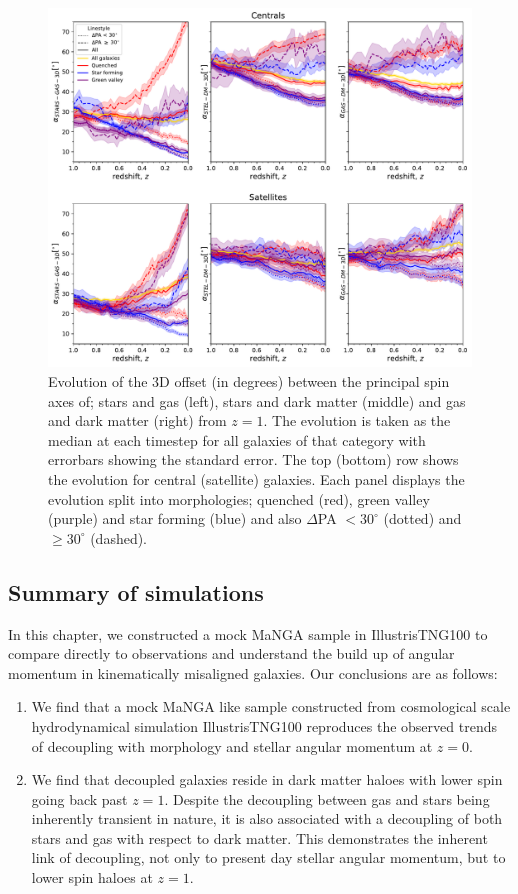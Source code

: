 \begin{figure}
	\includegraphics[width=\linewidth]{misalignment_TNG/3D_pa_evo_cen_sat.pdf}
    \caption{Evolution of the 3D offset (in degrees) between the principal spin axes of; stars and gas (left), stars and dark matter (middle) and gas and dark matter (right) from $z=1$. The evolution is taken as the median at each timestep for all galaxies of that category with errorbars showing the standard error. The top (bottom) row shows the evolution for central (satellite) galaxies. Each panel displays the evolution split into morphologies; quenched (red), green valley (purple) and star forming (blue) and also $\Delta$PA $< 30^{\circ}$ (dotted) and $\geq 30^{\circ}$ (dashed).}
    \label{fig:3D_alpha_evo}
\end{figure}

\subsection{Summary of simulations} \label{sec:tng_summary}
In this chapter, we constructed a mock MaNGA sample in IllustrisTNG100 to compare directly to observations and understand the build up of angular momentum in kinematically misaligned galaxies. Our conclusions are as follows:
\begin{enumerate}
    \item We find that a mock MaNGA like sample constructed from cosmological scale hydrodynamical simulation IllustrisTNG100 reproduces the observed trends of decoupling with morphology and stellar angular momentum at $z=0$.
    
    \item We find that decoupled galaxies reside in dark matter haloes with lower spin going back past $z=1$. Despite the decoupling between gas and stars being inherently transient in nature, it is also associated with a decoupling of both stars and gas with respect to dark matter. This demonstrates the inherent link of decoupling, not only to present day stellar angular momentum, but to lower spin haloes at $z=1$. 

\end{enumerate}

